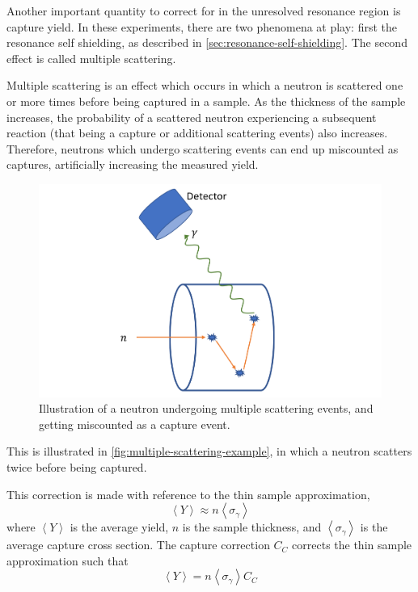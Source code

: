 Another important quantity to correct for in the unresolved resonance region is capture yield. In these experiments, there are two phenomena at play: first the resonance self shielding, as described in \autoref{sec:resonance-self-shielding}. The second effect is called multiple scattering.

Multiple scattering is an effect which occurs in which a neutron is scattered one or more times before being captured in a sample. As the thickness of the sample increases, the probability of a scattered neutron experiencing a subsequent reaction (that being a capture or additional scattering events) also increases. Therefore, neutrons which undergo scattering events can end up miscounted as captures, artificially increasing the measured yield.
\begin{figure}[H]
    \centering
    \includegraphics[width=0.75\linewidth]{Figures/multiplescattering.png}
    \caption{Illustration of a neutron undergoing multiple scattering events, and getting miscounted as a capture event.}
    \label{fig:multiple-scattering-example}
\end{figure}
This is illustrated in \autoref{fig:multiple-scattering-example}, in which a neutron scatters twice before being captured.

This correction is made with reference to the thin sample approximation,
\begin{equation}
    \label{eq:thin-sample-approximation}
    \left\langle Y \right\rangle \approx n \left\langle \sigma_\gamma \right\rangle 
\end{equation}
where $\left\langle Y \right\rangle$ is the average yield, $n$ is the sample thickness, and $\left\langle \sigma_\gamma \right\rangle$ is the average capture cross section. The capture correction $C_C$ corrects the thin sample approximation such that
\begin{equation}
    \label{eq:correction-thin-sample-approximation}
    \left\langle Y \right\rangle = n \left\langle \sigma_\gamma \right\rangle C_C
\end{equation}

